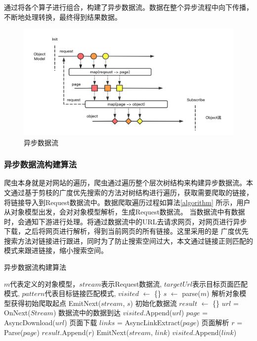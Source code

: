 \documentclass[master]{njuthesis}
\begin{document}
通过将各个算子进行组合，构建了异步数据流。数据在整个异步流程中向下传播，不断地处理转换，最终得到结果数据。

\begin{figure}[htbp]
\centering
\includegraphics[width= 1\textwidth]{pic/reactive-model.png}
\caption{异步数据流}\label{fig:model}
\end{figure}

\subsubsection{异步数据流构建算法}
爬虫本身就是对网站的遍历，爬虫通过遍历整个层次树结构来构建异步数据流。本文通过基于剪枝的广度优先搜索的方法对树结构进行遍历，获取需要爬取的链接，
将链接导入到Request数据流中。数据爬取遍历过程如算法\ref{algorithm} 所示，用户从对象模型出发，会对对象模型解析，生成Request数据流。
当数据流中有数据时，会通知下游进行处理。将通过数据流中的URL去请求网页，对网页进行异步下载，之后将网页进行解析，得到当前网页的所有链接。这里采用的是
广度优先搜索方法对链接进行跟进，同时为了防止搜索空间过大，本文通过链接正则匹配的模式来跟进链接，缩小搜索空间。


\begin{algorithm}[htbp]
 \caption{异步数据流构建算法}
 \label{algorithm}
 \begin{algorithmic}[1]
  \REQUIRE $m$代表定义的对象模型，$stream$表示Request数据流, $targetUrl$表示目标页面匹配模式, $pattern$代表目标链接匹配模式, 
  \STATE $visited$ $\gets$ \{\}
  \STATE $s$ $\gets$ parse($m$) 解析对象模型获得初始爬取起点
  \STATE EmitNext($stream$, $s$) 初始化数据流
  \STATE $result$  $\gets$ \{\}
    \STATE $url$ = OnNext($Stream$) 数据流中的数据到达
    \STATE $visited$.Append($url$)
    \STATE $page$ = AsyncDownload($url$) 页面下载
    \STATE $links$ = AsyncLinkExtract($page$) 页面解析
      \STATE $r$ = Parse($page$)
      \STATE $result$.Append($r$)
    \ENDIF
        \STATE EmitNext($stream$, $link$)
        \STATE $visited$.Append($link$)
      \ENDIF
    \ENDFOR
  \ENDWHILE
 \end{algorithmic}
\end{algorithm}
\end{document}
